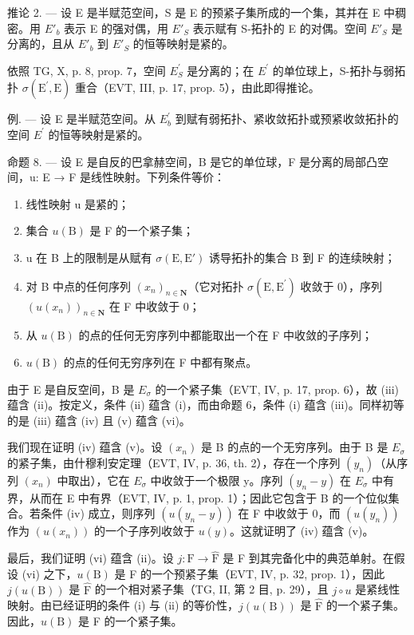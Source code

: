 推论 2. --- 设 E 是半赋范空间，S 是 E 的预紧子集所成的一个集，其并在 E 中稠密。用 \(E'_{b}\) 表示 E 的强对偶，用 \(E'_{S}\) 表示赋有 S-拓扑的 E 的对偶。空间 \(E'_{S}\) 是分离的，且从 \(E'_{b}\) 到 \(E'_{S}\) 的恒等映射是紧的。

依照 TG, X, p. 8, prop. 7，空间 \(E_{S}^{\prime}\) 是分离的；在 \(E^{\prime}\) 的单位球上，S-拓扑与弱拓扑 \(\sigma(\mathrm{E}^{\prime},\mathrm{E})\) 重合（EVT, III, p. 17, prop. 5），由此即得推论。

例. --- 设 E 是半赋范空间。从 \(E_{b}^{\prime}\) 到赋有弱拓扑、紧收敛拓扑或预紧收敛拓扑的空间 \(E^{\prime}\) 的恒等映射是紧的。

命题 8. --- 设 E 是自反的巴拿赫空间，B 是它的单位球，F 是分离的局部凸空间，u: E → F 是线性映射。下列条件等价：

\begin{enumerate}
\def\labelenumi{(\roman{enumi})}
\item
  线性映射 u 是紧的；
\item
  集合 \(u(\mathrm{B})\) 是 F 的一个紧子集；
\item
  u 在 B 上的限制是从赋有 \(\sigma(\mathrm{E},\mathrm{E}')\) 诱导拓扑的集合 B 到 F 的连续映射；
\item
  对 B 中点的任何序列 \((x_{n})_{n\in \mathbf{N}}\)（它对拓扑 \(\sigma (\mathrm{E},\mathrm{E}^{\prime})\) 收敛于 0），序列 \((u(x_n))_{n\in \mathbf{N}}\) 在 F 中收敛于 0；
\item
  从 \(u(\mathrm{B})\) 的点的任何无穷序列中都能取出一个在 F 中收敛的子序列；
\item
  \(u(\mathrm{B})\) 的点的任何无穷序列在 F 中都有聚点。
\end{enumerate}

由于 E 是自反空间，B 是 \(E_{\sigma}\) 的一个紧子集（EVT, IV, p. 17, prop. 6），故 (iii) 蕴含 (ii)。按定义，条件 (ii) 蕴含 (i)，而由命题 6，条件 (i) 蕴含 (iii)。同样初等的是 (iii) 蕴含 (iv) 且 (v) 蕴含 (vi)。

我们现在证明 (iv) 蕴含 (v)。设 \((x_{n})\) 是 B 的点的一个无穷序列。由于 B 是 \(E_{\sigma}\) 的紧子集，由什穆利安定理（EVT, IV, p. 36, th. 2），存在一个序列 \((y_{n})\)（从序列 \((x_{n})\) 中取出），它在 \(E_{\sigma}\) 中收敛于一个极限 y。序列 \((y_{n}-y)\) 在 \(E_{\sigma}\) 中有界，从而在 E 中有界（EVT, IV, p. 1, prop. 1）；因此它包含于 B 的一个位似集合。若条件 (iv) 成立，则序列 \((u(y_{n}-y))\) 在 F 中收敛于 0，而 \((u(y_{n}))\) 作为 \((u(x_{n}))\) 的一个子序列收敛于 \(u(y)\)。这就证明了 (iv) 蕴含 (v)。

最后，我们证明 (vi) 蕴含 (ii)。设 \(j: \mathrm{F} \to \widehat{\mathrm{F}}\) 是 F 到其完备化中的典范单射。在假设 (vi) 之下，\(u(\mathrm{B})\) 是 F 的一个预紧子集（EVT, IV, p. 32, prop. 1），因此 \(j(u(\mathrm{B}))\) 是 \(\widehat{\mathrm{F}}\) 的一个相对紧子集（TG, II, 第 2 目, p. 29），且 \(j \circ u\) 是紧线性映射。由已经证明的条件 (i) 与 (ii) 的等价性，\(j(u(\mathrm{B}))\) 是 \(\widehat{\mathrm{F}}\) 的一个紧子集。因此，\(u(\mathrm{B})\) 是 F 的一个紧子集。

